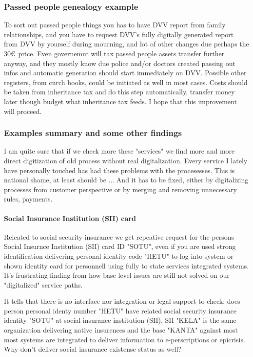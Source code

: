 \subsubsection{Passed people genealogy example}
To sort out passed people things you has to have DVV report from family relationships,
and you have to request DVV's fully digitally generated report from DVV by yourself during mourning,
and lot of other changes due perhaps the 30\euro~price.
Even governemnt will tax passed people assets transfer further anyway,
and they mostly know due police and/or doctors created passing out infos
and automatic generation should start immediately on DVV.
Possible other registers, from curch books, could be initiated as well in most cases.
Costs should be taken from inheritance tax and do this step automatically,
transfer money later though budget what inheritance tax feeds.
I hope that this improvement\cite{SukuselvitysPerukirja} will proceed.

\subsubsection{Examples summary and some other findings}
\label{examples_summary_and_findings}
I am quite sure that if we check more these "services" we find more and more
direct digitization of old process without real digitalization.
Every service I lately have personally touched has had these problems with the
procesesses. This is national shame, at least should
be \cite{Many_Stepwise_Rules_Leads_To_Mess}\-\cite{StudentHousingAllowance}\-\cite{ElakelaisetEivatTieda}...
And it has to be fixed, either by digitalizing processes from customer
perspective or by merging and removing unnecessary rules, payments.

\paragraph{Social Insurance Institution (SII) card}
\label{SII_card}
Releated to social security insurance we get repeative request for the persons
Social Insurnce Institution (SII) card ID "SOTU", even if you are used strong
identification delivering personal identity code "HETU" to log into system or
shown identity card for personnell using fully to state services integrated
systems. It's frustrating finding from how base level issues are still not
solved on our "digitalized" service paths.

It tells that there is no interface nor integration or legal support to check;
does person personal identy number "HETU" have related social security
insurance identity "SOTU" at social insurance institution (SII). SII "KELA" is
the same organization delivering native insurences and the base "KANTA" against
most most systems are integrated to deliver information to e-perscriptions or
epicrisis. Why don't deliver social insurance existense status as well?

